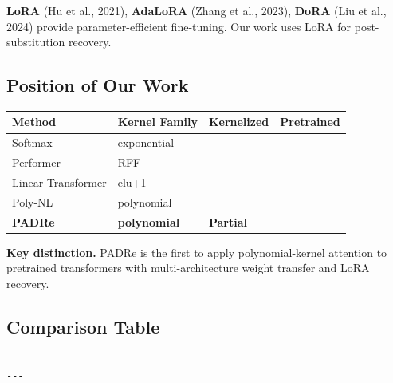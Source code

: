 \textbf{LoRA} (Hu et al., 2021), \textbf{AdaLoRA} (Zhang et al., 2023), \textbf{DoRA} 
(Liu et al., 2024) provide parameter-efficient fine-tuning. Our work uses 
LoRA for post-substitution recovery.

\subsection{Position of Our Work}

\begin{table}[H]
\centering
\small
\begin{tabular}{llll}
\toprule
\textbf{Method} & \textbf{Kernel Family} & \textbf{Kernelized} & \textbf{Pretrained} \\
\midrule
Softmax & exponential &  & -- \\
Performer & RFF &  &  \\
Linear Transformer & elu+1 &  &  \\
Poly-NL & polynomial &  &  \\
\textbf{PADRe} & \textbf{polynomial} & \textbf{Partial} & \textbf{ } \\
\bottomrule
\end{tabular}
\end{table}

\textbf{Key distinction.} PADRe is the first to apply polynomial-kernel attention 
to pretrained transformers with multi-architecture weight transfer and 
LoRA recovery.



\subsection{Comparison Table}

\begin{lstlisting}

---
\end{lstlisting}